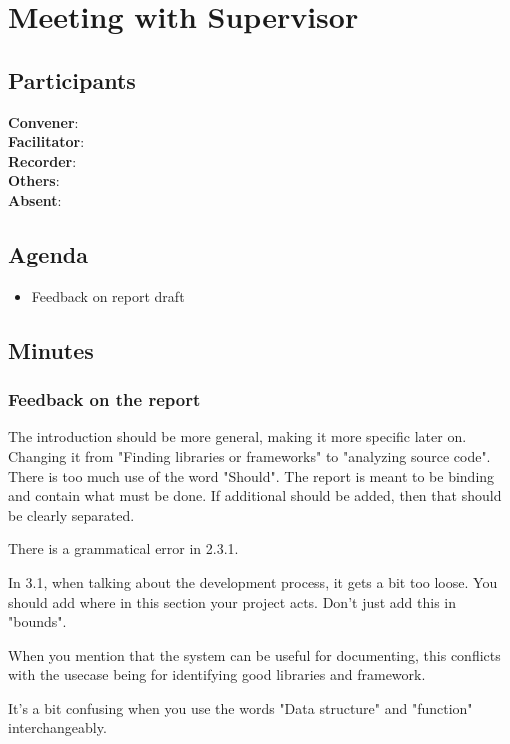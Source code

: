 \section*{Meeting with Supervisor}

\subsection*{Participants}

\textbf{Convener}: \supervisor{}\\
\textbf{Facilitator}: \facilitator{}  \\
\textbf{Recorder}: \scrummaster{}  \\
\textbf{Others}: \groupleader{}                         \\
\textbf{Absent}: 

\subsection*{Agenda}
\begin{itemize}
    \item Feedback on report draft

\end{itemize}

\subsection*{Minutes}

\subsubsection*{Feedback on the report}
The introduction should be more general, making it more specific later on. Changing it from "Finding libraries or frameworks" to "analyzing source code". 
There is too much use of the word "Should". The report is meant to be binding and contain what must be done. If additional should be added, then that should be clearly separated.

There is a grammatical error in 2.3.1. 


In 3.1, when talking about the development process, it gets a bit too loose. You should add where in this section your project acts. Don't just add this in "bounds".

When you mention that the system can be useful for documenting, this conflicts with the usecase being for identifying good libraries and framework.

It's a bit confusing when you use the words "Data structure" and "function" interchangeably. 

